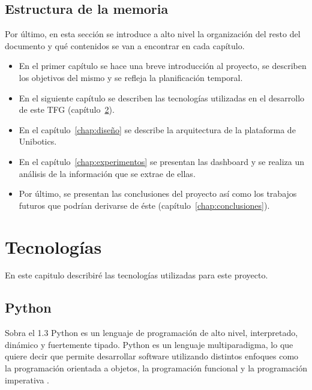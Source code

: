 \documentclass[a4paper, 12pt]{book}
\begin{document}
\section{Estructura de la memoria}
\label{sec:estructura}

Por último, en esta sección se introduce a alto nivel la organización del resto del documento
y qué contenidos se van a encontrar en cada capítulo.

    \begin{itemize}
      \item En el primer capítulo se hace una breve introducción al proyecto, se describen los objetivos del mismo y se refleja la planificación temporal.
      \item En el siguiente capítulo se describen las tecnologías utilizadas en el desarrollo de este TFG (capítulo~\ref{chap:tecnologias}).
      \item En el capítulo~\ref{chap:diseño} se describe la arquitectura de la plataforma de Unibotics.
      \item En el capítulo~\ref{chap:experimentos} se presentan las dashboard y se realiza un análisis de la información que se extrae de ellas.
      \item Por último, se presentan las conclusiones del proyecto así como los trabajos futuros que podrían derivarse de éste (capítulo~\ref{chap:conclusiones}).
    \end{itemize}

\cleardoublepage


\chapter{Tecnologías}               %
\label{chap:tecnologias}

En este capitulo describiré las tecnologías utilizadas para este proyecto.


\section{Python}
\label{sec:python}
Sobra el 1.3
Python es un lenguaje de programación de alto nivel, interpretado, dinámico y fuertemente tipado. Python es un lenguaje multiparadigma, lo que quiere decir que permite desarrollar software utilizando distintos enfoques como la programación orientada a objetos, la programación funcional y
la programación imperativa \cite{intropython}.
\end{document}
